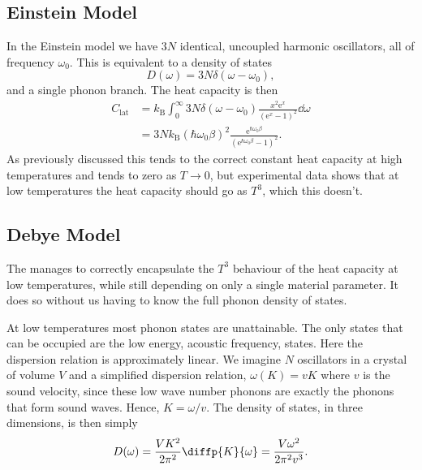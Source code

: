 \documentclass[fleqn]{NotesClass}
\newcommand*{\boltzmann}{k_{\mathrm{B}}}
\newcommand*{\e}{\mathrm{e}}
\begin{document}
    \subsection{Einstein Model}
    In the Einstein model we have \(3N\) identical, uncoupled harmonic oscillators, all of frequency \(\omega_0\).
    This is equivalent to a density of states
    \begin{equation}
        D(\omega) = 3N\delta(\omega - \omega_0),
    \end{equation}
    and a single phonon branch.
    The heat capacity is then
    \begin{align}
        C_{\mathrm{lat}} &= \boltzmann \int_{0}^{\infty} 3N \delta(\omega - \omega_0) \frac{x^2\e^x}{(\e^x - 1)^2} \dd{\omega}\\
        &= 3N\boltzmann \left( \hbar\omega_0\beta \right)^2 \frac{\e^{\hbar\omega_0\beta}}{(\e^{\hbar\omega_0\beta} - 1)^2}.
    \end{align}
    As previously discussed this tends to the correct constant heat capacity at high temperatures and tends to zero as \(T \to 0\), but experimental data shows that at low temperatures the heat capacity should go as \(T^3\), which this doesn't.
    
    \subsection{Debye Model}\label{sec:debye model}
    The  manages to correctly encapsulate the \(T^3\) behaviour of the heat capacity at low temperatures, while still depending on only a single material parameter.
    It does so without us having to know the full phonon density of states.
    
    At low temperatures most phonon states are unattainable.
    The only states that can be occupied are the low energy, acoustic frequency, states.
    Here the dispersion relation is approximately linear.
    We imagine \(N\) oscillators in a crystal of volume \(V\) and a simplified dispersion relation, \(\omega(K) = vK\) where \(v\) is the sound velocity, since these low wave number phonons are exactly the phonons that form sound waves.
    Hence, \(K = \omega/v\).
    The density of states, in three dimensions, is then simply
    \begin{equation}
        D(\omega) = \frac{VK^2}{2\pi^2} \diffp{K}{\omega} = \frac{V\omega^2}{2\pi^2v^3}.
    \end{equation}
    
\end{document}
